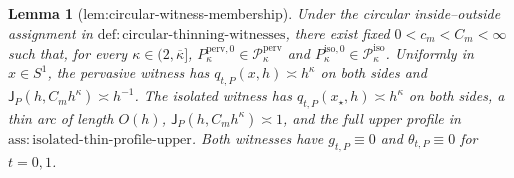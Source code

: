 \documentclass{article}
\newtheorem{lemma}{Lemma}
\begin{document}
\begin{lemma}[lem:circular-witness-membership]\label{lem:circular-witness-membership}
Under the circular inside--outside assignment in \(\mathrm{def:circular\text{-}thinning\text{-}witnesses}\), there exist fixed \(0<c_m<C_m<\infty\) such that, for every \(\kappa\in(2,\overline\kappa]\), \(P_{\kappa}^{\mathrm{perv},0}\in\mathcal P_{\kappa}^{\mathrm{perv}}\) and \(P_{\kappa}^{\mathrm{iso},0}\in\mathcal P_{\kappa}^{\mathrm{iso}}\). Uniformly in \(x\in S^1\), the pervasive witness has \(q_{t,P}(x,h)\asymp h^{\kappa}\) on both sides and \(\mathsf J_P(h,C_mh^{\kappa})\asymp h^{-1}\). The isolated witness has \(q_{t,P}(x_{\star},h)\asymp h^{\kappa}\) on both sides, a thin arc of length \(O(h)\), \(\mathsf J_P(h,C_mh^{\kappa})\asymp1\), and the full upper profile in \(\mathrm{ass:isolated\text{-}thin\text{-}profile\text{-}upper}\). Both witnesses have \(g_{t,P}\equiv0\) and \(\theta_{t,P}\equiv0\) for \(t=0,1\).
\end{lemma}
\end{document}
